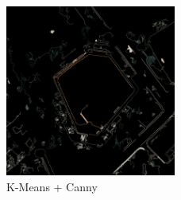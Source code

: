 \documentclass[article]{llncs}
\begin{document}
\begin{figure}[h]
  \centering
  \includegraphics[width=0.5\textwidth]{canny.png}
  \caption{K-Means + Canny}
  \label{fig:canny}
\end{figure}
\end{document}
